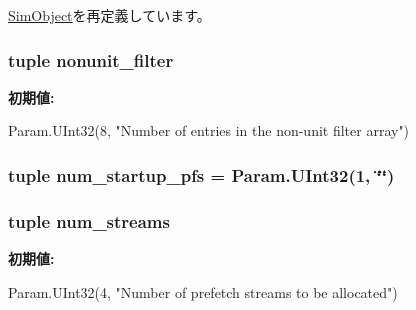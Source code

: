 \hyperlink{classm5_1_1SimObject_1_1SimObject_a17da7064bc5c518791f0c891eff05fda}{SimObject}を再定義しています。\hypertarget{classRubyPrefetcher_1_1Prefetcher_aab2387f276e44f6e43f11aacec71a559}{
\subsubsection[{nonunit\_\-filter}]{\setlength{\rightskip}{0pt plus 5cm}tuple {\bf nonunit\_\-filter}}}
\label{classRubyPrefetcher_1_1Prefetcher_aab2387f276e44f6e43f11aacec71a559}
{\bfseries 初期値:}
\begin{DoxyCode}
Param.UInt32(8,
        "Number of entries in the non-unit filter array")
\end{DoxyCode}
\hypertarget{classRubyPrefetcher_1_1Prefetcher_ae574bd0a6c875f2e802a7ae689a25a4e}{
\subsubsection[{num\_\-startup\_\-pfs}]{\setlength{\rightskip}{0pt plus 5cm}tuple {\bf num\_\-startup\_\-pfs} = Param.UInt32(1, \char`\"{}\char`\"{})}}
\label{classRubyPrefetcher_1_1Prefetcher_ae574bd0a6c875f2e802a7ae689a25a4e}
\hypertarget{classRubyPrefetcher_1_1Prefetcher_a4bdf506982ffaa0f791efff98d8dac94}{
\subsubsection[{num\_\-streams}]{\setlength{\rightskip}{0pt plus 5cm}tuple {\bf num\_\-streams}}}
\label{classRubyPrefetcher_1_1Prefetcher_a4bdf506982ffaa0f791efff98d8dac94}
{\bfseries 初期値:}
\begin{DoxyCode}
Param.UInt32(4,
        "Number of prefetch streams to be allocated")
\end{DoxyCode}
